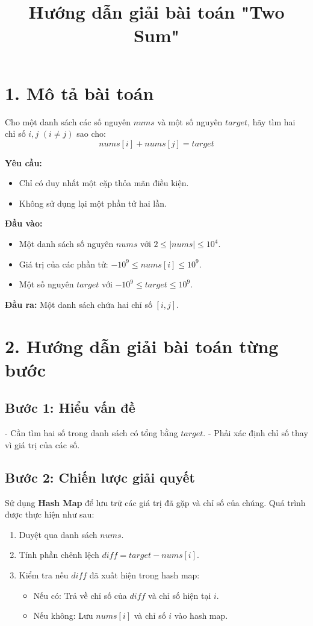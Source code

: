 \documentclass[a4paper,12pt]{article}
\title{Hướng dẫn giải bài toán "Two Sum"}
\author{}
\date{}
\begin{document}
\maketitle

\section*{1. Mô tả bài toán}

Cho một danh sách các số nguyên \(nums\) và một số nguyên \(target\), hãy tìm hai chỉ số \(i, j\) \((i \neq j)\) sao cho:
\[
nums[i] + nums[j] = target
\]

\textbf{Yêu cầu:}
\begin{itemize}
    \item Chỉ có duy nhất một cặp thỏa mãn điều kiện.
    \item Không sử dụng lại một phần tử hai lần.
\end{itemize}

\textbf{Đầu vào:}
\begin{itemize}
    \item Một danh sách số nguyên \(nums\) với \(2 \leq |nums| \leq 10^4\).
    \item Giá trị của các phần tử: \(-10^9 \leq nums[i] \leq 10^9\).
    \item Một số nguyên \(target\) với \(-10^9 \leq target \leq 10^9\).
\end{itemize}

\textbf{Đầu ra:} Một danh sách chứa hai chỉ số \([i, j]\).

\section*{2. Hướng dẫn giải bài toán từng bước}

\subsection*{Bước 1: Hiểu vấn đề}
- Cần tìm hai số trong danh sách có tổng bằng \(target\).
- Phải xác định chỉ số thay vì giá trị của các số.

\subsection*{Bước 2: Chiến lược giải quyết}
Sử dụng \textbf{Hash Map} để lưu trữ các giá trị đã gặp và chỉ số của chúng. Quá trình được thực hiện như sau:
\begin{enumerate}[label=\arabic*)]
    \item Duyệt qua danh sách \(nums\).
    \item Tính phần chênh lệch \(diff = target - nums[i]\).
    \item Kiểm tra nếu \(diff\) đã xuất hiện trong hash map:
    \begin{itemize}
        \item Nếu có: Trả về chỉ số của \(diff\) và chỉ số hiện tại \(i\).
        \item Nếu không: Lưu \(nums[i]\) và chỉ số \(i\) vào hash map.
    \end{itemize}
\end{enumerate}
\end{document}
